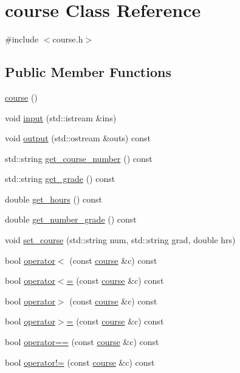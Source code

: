 \hypertarget{classcourse}{}\section{course Class Reference}
\label{classcourse}


{\ttfamily \#include $<$course.\+h$>$}

\subsection*{Public Member Functions}
\begin{DoxyCompactItemize}
\item 
\hyperlink{classcourse_a56fe8c0b1c3a9022eee53e8557c16629}{course} ()
\item 
void \hyperlink{classcourse_a0a8839f2369903101399bca60547aed2}{input} (std\+::istream \&ins)
\item 
void \hyperlink{classcourse_afdd5ccf71bbbb7797b75854f16bf373f}{output} (std\+::ostream \&outs) const
\item 
std\+::string \hyperlink{classcourse_a8b2f74ab01eae52d779979887fc3b079}{get\+\_\+course\+\_\+number} () const
\item 
std\+::string \hyperlink{classcourse_a5008b6a7c44047fefa1c7779b771aad4}{get\+\_\+grade} () const
\item 
double \hyperlink{classcourse_a09f7b2b40cbbb81c94e0642d5b13663e}{get\+\_\+hours} () const
\item 
double \hyperlink{classcourse_aad43a6b7ce264bd4038472fc3e40cf16}{get\+\_\+number\+\_\+grade} () const
\item 
void \hyperlink{classcourse_a1fce1a16efb3f07d0da5daca8005e4a6}{set\+\_\+course} (std\+::string num, std\+::string grad, double hrs)
\item 
bool \hyperlink{classcourse_aa47eab66d21e10a44ff77f634406face}{operator$<$} (const \hyperlink{classcourse}{course} \&c) const
\item 
bool \hyperlink{classcourse_ab96de818d7b97e4e259fc6add5e0bc54}{operator$<$=} (const \hyperlink{classcourse}{course} \&c) const
\item 
bool \hyperlink{classcourse_a16df685718a7ca9e98408b65109897b6}{operator$>$} (const \hyperlink{classcourse}{course} \&c) const
\item 
bool \hyperlink{classcourse_ad15d2508cfb6d22103aaec608bcfdc74}{operator$>$=} (const \hyperlink{classcourse}{course} \&c) const
\item 
bool \hyperlink{classcourse_aafce75fc85cdb94a5a08eaaba359da16}{operator==} (const \hyperlink{classcourse}{course} \&c) const
\item 
bool \hyperlink{classcourse_ae01c5e2445600d485da28e0ba7c48b3a}{operator!=} (const \hyperlink{classcourse}{course} \&c) const
\end{DoxyCompactItemize}


